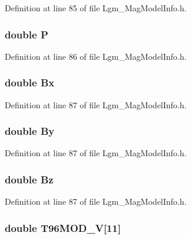 Definition at line 85 of file Lgm\_\-MagModelInfo.h.\hypertarget{struct_lgm___mag_model_info_8019aa9167c19c810aefa4cd5c0b0ab5}{
\subsubsection[{P}]{\setlength{\rightskip}{0pt plus 5cm}double {\bf P}}}
\label{struct_lgm___mag_model_info_8019aa9167c19c810aefa4cd5c0b0ab5}




Definition at line 86 of file Lgm\_\-MagModelInfo.h.\hypertarget{struct_lgm___mag_model_info_5fa1384b59affe6ed504db99bba961fe}{
\subsubsection[{Bx}]{\setlength{\rightskip}{0pt plus 5cm}double {\bf Bx}}}
\label{struct_lgm___mag_model_info_5fa1384b59affe6ed504db99bba961fe}




Definition at line 87 of file Lgm\_\-MagModelInfo.h.\hypertarget{struct_lgm___mag_model_info_01b195b7d857f35425ee41d84eea6a1a}{
\subsubsection[{By}]{\setlength{\rightskip}{0pt plus 5cm}double {\bf By}}}
\label{struct_lgm___mag_model_info_01b195b7d857f35425ee41d84eea6a1a}




Definition at line 87 of file Lgm\_\-MagModelInfo.h.\hypertarget{struct_lgm___mag_model_info_cf4e512cfc2056dc67f7f73aeb07ea3b}{
\subsubsection[{Bz}]{\setlength{\rightskip}{0pt plus 5cm}double {\bf Bz}}}
\label{struct_lgm___mag_model_info_cf4e512cfc2056dc67f7f73aeb07ea3b}




Definition at line 87 of file Lgm\_\-MagModelInfo.h.\hypertarget{struct_lgm___mag_model_info_bc39a5f9f3bf06b9ae46dd8588d3bd79}{
\subsubsection[{T96MOD\_\-V}]{\setlength{\rightskip}{0pt plus 5cm}double {\bf T96MOD\_\-V}\mbox{[}11\mbox{]}}}
\label{struct_lgm___mag_model_info_bc39a5f9f3bf06b9ae46dd8588d3bd79}




